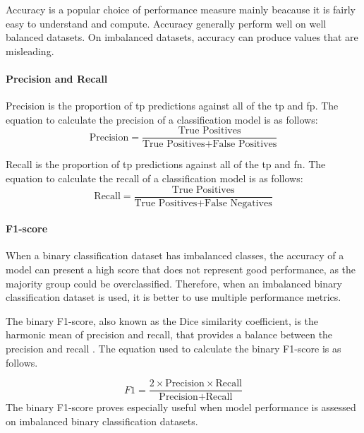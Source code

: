 \documentclass[10pt, conference]{IEEEtran}
\begin{document}
Accuracy is a popular choice of performance measure mainly beacause it is fairly easy to understand and compute.
Accuracy generally perform well on well balanced datasets. On imbalanced datasets, accuracy can produce
values that are misleading.

\paragraph{Precision and Recall}
Precision is the proportion of \acrfull{tp} predictions against all of the \acrshort{tp} and \acrfull{fp}.
The equation to calculate the precision of a classification model is as follows:
\begin{equation}
    \text{Precision} = \frac{\text{True Positives}}{\text{True Positives} + \text{False Positives}} \label{Precision}
\end{equation}

Recall is the proportion of \acrshort{tp} predictions against all of the \acrshort{tp} and \acrfull{fn}.
The equation to calculate the recall of a classification model is as follows:
\begin{equation}
    \text{Recall} = \frac{\text{True Positives}}{\text{True Positives} + \text{False Negatives}} \label{Recall}
\end{equation}

\paragraph{F1-score}

When a binary classification dataset has imbalanced classes, the accuracy of a model can present a high score that does not
represent good performance, as the majority group could be overclassified. Therefore, when an imbalanced binary classification
dataset is used, it is better to use multiple performance metrics.

The binary F1-score, also known as the Dice
similarity coefficient, is the harmonic mean of precision and recall, that provides a balance between the
precision and recall \cite{F1-score_ref}.
The equation used to calculate the binary F1-score is as follows.

\begin{equation}
    F1 = \frac{2 \times \text{Precision} \times \text{Recall}}{\text{Precision} + \text{Recall}} \label{F1}
\end{equation}
The binary F1-score proves especially useful when model performance is assessed on imbalanced binary classification
datasets.
\end{document}
